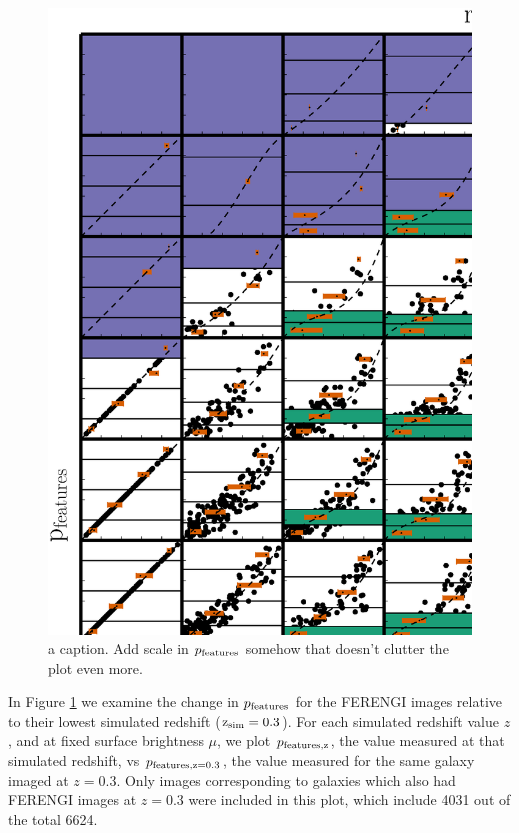 \documentclass[usenatbib]{mn2e}
\begin{document}
\begin{figure}
\begin{center}
\includegraphics[width=\textwidth]{p_vs_p_SB_redshift.ps}
\caption{a caption. Add scale in $p_{\rm features}$ somehow that doesn't clutter the plot even more. }
\label{fig:p_vs_p}
\end{center}
\end{figure}

In Figure \ref{fig:p_vs_p} we examine the change in $p_{\rm features}$ for the FERENGI images relative to their lowest simulated redshift ($\rm z_{sim}=0.3$). For each simulated redshift value $z$, and at fixed surface brightness $\mu$, we plot $p_{\rm features,z}$, the value measured at that simulated redshift, vs $p_{\rm features,z=0.3}$, the value measured for the same galaxy imaged at $z=0.3$. Only images corresponding to galaxies which also had FERENGI images at $z=0.3$ were included in this plot, which include 4031 out of the total 6624.
 
\end{document}
